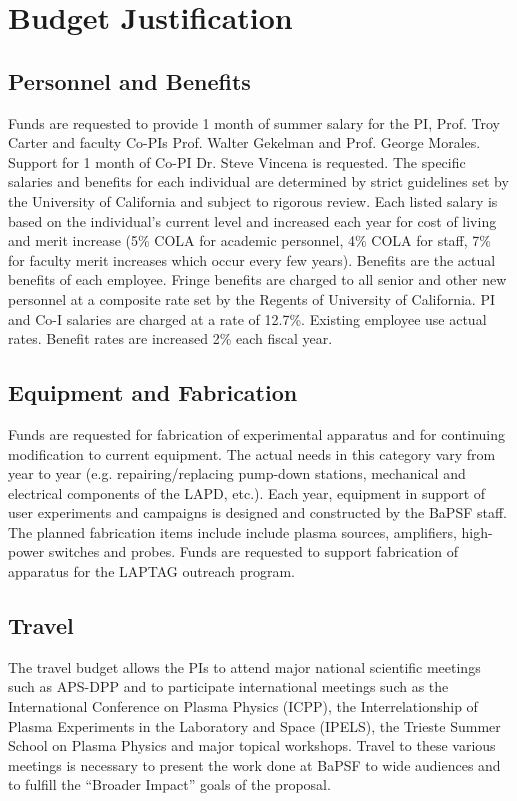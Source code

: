 \documentclass[11pt]{article}
\date{}
\begin{document}
\section*{Budget Justification}

\subsection*{Personnel and Benefits}

Funds are requested to provide 1 month of summer salary for the PI,
Prof. Troy Carter and faculty Co-PIs Prof. Walter Gekelman and
Prof. George Morales.  Support for 1 month of Co-PI Dr. Steve Vincena
is requested.  The specific salaries and benefits for each individual
are determined by strict guidelines set by the University of
California and subject to rigorous review. Each listed salary is based
on the individual’s current level and increased each year for cost of
living and merit increase (5\% COLA for academic personnel, 4\% COLA
for staff, 7\% for faculty merit increases which occur every few
years). Benefits are the actual benefits of each employee.  Fringe
benefits are charged to all senior and other new personnel at a
composite rate set by the Regents of University of California.  PI and
Co-I salaries are charged at a rate of 12.7\%.  Existing employee use
actual rates.  Benefit rates are increased 2\% each fiscal year.




\subsection*{Equipment and Fabrication}

Funds are requested for fabrication of experimental apparatus and for
continuing modification to current equipment.   The actual needs in this category
vary from year to year (e.g. repairing/replacing pump-down stations,
mechanical and electrical components of the LAPD, etc.).  Each year, equipment in support of
user experiments and campaigns is designed and constructed by the
BaPSF staff. The planned fabrication items include
include plasma sources, amplifiers, high-power switches
and probes.   Funds are requested to support fabrication of apparatus
for the LAPTAG outreach program.  


\subsection*{Travel}

The travel budget allows the PIs
to attend major national scientific meetings such as APS-DPP and to
participate international meetings such as the International
Conference on Plasma Physics (ICPP), the Interrelationship of Plasma
Experiments in the Laboratory and Space (IPELS), the Trieste Summer
School on Plasma Physics and major topical workshops. Travel to these
various meetings is necessary to present the work done at BaPSF to
wide audiences and to fulfill the “Broader Impact” goals of the
proposal.
\end{document}
